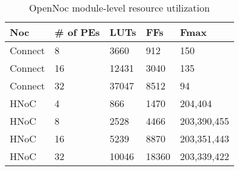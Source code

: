 \begin{table}[!t]
  \centering
  \caption{OpenNoc module-level resource utilization} 
  \begin{tabular}{l|l|l|l|l}
      \toprule
      Noc & \# of PEs & LUTs & FFs & Fmax \\
      \midrule
      Connect & 8      & 3660 & 912 & 150  \\
      Connect & 16     & 12431 & 3040 & 135 \\
      Connect & 32     & 37047 & 8512 & 94 \\    
      
      HNoC & 4         & 866  & 1470 & 204,404\\
      HNoC & 8         & 2528 & 4466 & 203,390,455\\
      HNoC & 16        & 5239 & 8870 & 203,351,443 \\
      HNoC & 32        & 10046 & 18360 & 203,339,422\\
      \bottomrule
    \end{tabular}
	\label{table:systemResourceConsumption}
\end{table}